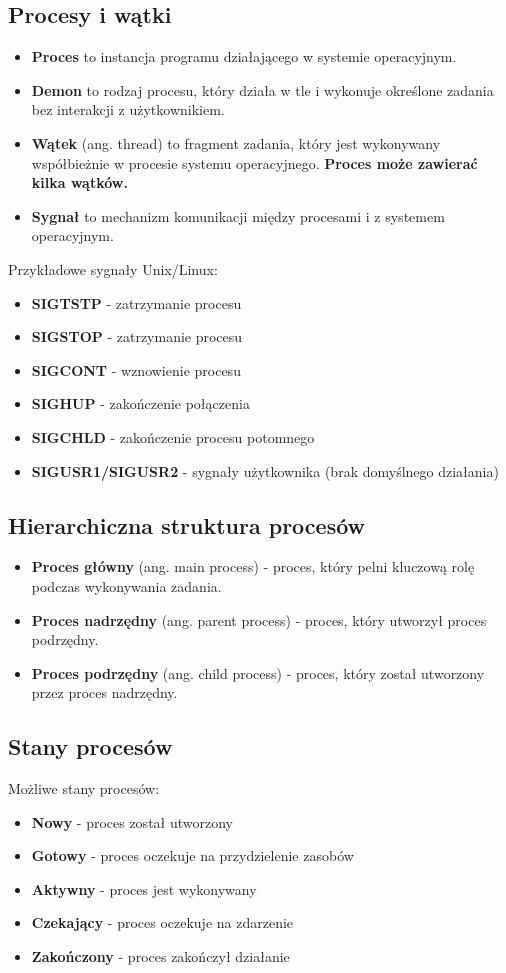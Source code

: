 \documentclass{article}
\begin{document}
\subsection{Procesy i wątki}
\begin{itemize}
    \item \textbf{Proces} to instancja programu działającego w systemie operacyjnym.
    \item \textbf{Demon} to rodzaj procesu, który działa w tle i wykonuje określone zadania bez interakcji z użytkownikiem.
    \item \textbf{Wątek} (ang. thread) to fragment zadania, który jest wykonywany współbieżnie w procesie systemu operacyjnego. \textbf{Proces może zawierać kilka wątków.}
    \item \textbf{Sygnał} to mechanizm komunikacji między procesami i z systemem operacyjnym.
\end{itemize}
\newpage Przykładowe sygnały Unix/Linux:
\begin{itemize}
    \item \textbf{SIGTSTP} - zatrzymanie procesu
    \item \textbf{SIGSTOP} - zatrzymanie procesu
    \item \textbf{SIGCONT} - wznowienie procesu
    \item \textbf{SIGHUP} - zakończenie połączenia
    \item \textbf{SIGCHLD} - zakończenie procesu potomnego
    \item \textbf{SIGUSR1/SIGUSR2} - sygnały użytkownika (brak domyślnego działania)
\end{itemize}

\subsection{Hierarchiczna struktura procesów}
\begin{itemize}
    \item \textbf{Proces główny} (ang. main process) - proces, który pelni kluczową rolę podczas wykonywania zadania.
    \item \textbf{Proces nadrzędny} (ang. parent process) - proces, który utworzył proces podrzędny.
    \item \textbf{Proces podrzędny} (ang. child process) - proces, który został utworzony przez proces nadrzędny.
\end{itemize}

\subsection{Stany procesów}
Możliwe stany procesów:
\begin{itemize}
    \item \textbf{Nowy} - proces został utworzony
    \item \textbf{Gotowy} - proces oczekuje na przydzielenie zasobów
    \item \textbf{Aktywny} - proces jest wykonywany
    \item \textbf{Czekający} - proces oczekuje na zdarzenie
    \item \textbf{Zakończony} - proces zakończył działanie
\end{itemize}
\end{document}
